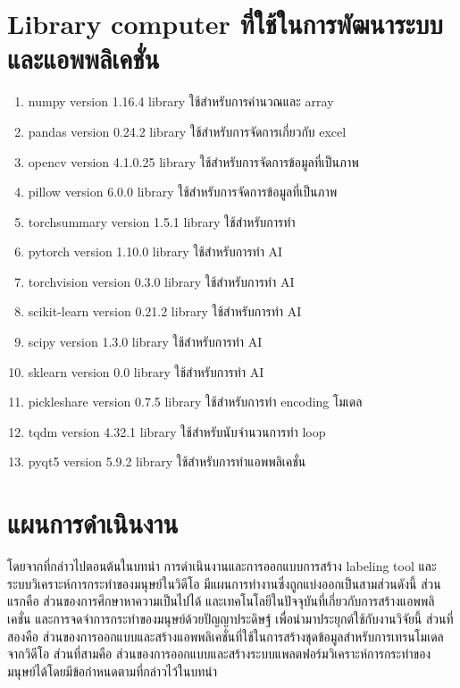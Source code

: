 \section{Library computer ที่ใช้ในการพัฒนาระบบและแอพพลิเคชั่น} 
\begin{enumerate}\setlength\itemsep{-0.3em}
	\item numpy		\quad\quad\quad version 1.16.4	\quad library ใช้สำหรับการคำนวณและ array
	\item pandas		\quad\quad\quad version 0.24.2	\quad library ใช้สำหรับการจัดการเกี่ยวกับ excel
	\item opencv		\quad\quad \quad version 4.1.0.25	\quad library ใช้สำหรับการจัดการข้อมูลที่เป็นภาพ
	\item pillow		\quad\quad\quad version 6.0.0		\quad library  ใช้สำหรับการจัดการข้อมูลที่เป็นภาพ
	\item torchsummary	\quad version 1.5.1		\quad library ใช้สำหรับการทำ 
	\item pytorch		\quad\quad\quad version 1.10.0	\quad library ใช้สำหรับการทำ AI
	\item torchvision		\quad\quad version 0.3.0	 	\quad library ใช้สำหรับการทำ AI
	\item scikit-learn	\quad\quad version 0.21.2	\quad library ใช้สำหรับการทำ AI
	\item scipy			\quad\quad\quad\quad version 1.3.0		\quad library ใช้สำหรับการทำ AI
	\item sklearn		\quad\quad\quad version 0.0		\quad library ใช้สำหรับการทำ AI
	\item pickleshare	\quad\quad version 0.7.5		\quad library ใช้สำหรับการทำ encoding โมเดล
	\item tqdm			\quad\quad\quad\quad version 4.32.1	\quad library ใช้สำหรับนับจำนวนการทำ loop
	\item pyqt5		\quad\quad\quad\quad version 5.9.2		\quad library ใช้สำหรับการทำแอพพลิเคชั่น
\end{enumerate}


\vspace{3mm}
\section{แผนการดำเนินงาน}
โดยจากที่กล่าวไปตอนต้นในบทนำ
การดำเนินงานและการออกแบบการสร้าง labeling tool และระบบวิเคราะห์การกระทำของมนุษย์ในวิดีโอ มีแผนการทำงานซึ่งถูกแบ่งออกเป็นสามส่วนดังนี้ 
ส่วนแรกคือ ส่วนของการศึกษาหาความเป็นไปได้ และเทคโนโลยีในปัจจุบันที่เกี่ยวกับการสร้างแอพพลิเคชั่น และการจดจำการกระทำของมนุษย์ด้วยปัญญาประดิษฐ์ เพื่อนำมาประยุกต์ใช้กับงานวิจัยนี้
ส่วนที่สองคือ ส่วนของการออกแบบและสร้างแอพพลิเคชั่นที่ใช้ในการสร้างชุดข้อมูลสำหรับการเทรนโมเดลจากวิดีโอ
ส่วนที่สามคือ ส่วนของการออกแบบและสร้างระบบแพลตฟอร์มวิเคราะห์การกระทำของมนุษย์ได้โดยมีข้อกำหนดตามที่กล่าวไว้ในบทนำ

